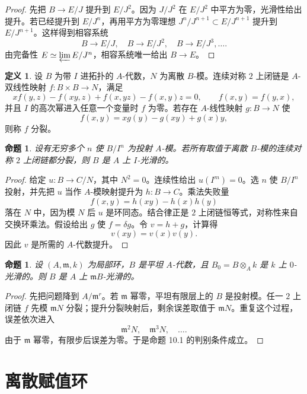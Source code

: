 \documentclass[11pt,a4paper,openany]{ctexbook}
\numberwithin{equation}{chapter}
\theoremstyle{plain}
\newtheorem{proposition}[theorem]{命题}
\theoremstyle{definition}
\newtheorem{definition}[theorem]{定义}
\theoremstyle{remark}
\begin{document}
\begin{proof}
先把 $B\to E/J$ 提升到 $E/J^2$。因为 $J/J^2$ 在 $E/J^2$ 中平方为零，光滑性给出提升。若已经提升到 $E/J^n$，再用平方为零理想 $J^n/J^{n+1}\subset E/J^{n+1}$ 提升到 $E/J^{n+1}$。这样得到相容系统
\[
  B\to E/J,\quad B\to E/J^2,\quad B\to E/J^3,\ldots.
\]
由完备性 $E\simeq\varprojlim E/J^n$，相容系统唯一给出 $B\to E$。
\end{proof}

\begin{definition}
设 $B$ 为带 $I$ 进拓扑的 $A$-代数，$N$ 为离散 $B$-模。连续对称 $2$ 上闭链是 $A$-双线性映射 $f:B\times B\to N$，满足
\[
  xf(y,z)-f(xy,z)+f(x,yz)-f(x,y)z=0,\qquad f(x,y)=f(y,x),
\]
并且 $I$ 的高次幂进入任意一个变量时 $f$ 为零。若存在 $A$-线性映射 $g:B\to N$ 使
\[
  f(x,y)=xg(y)-g(xy)+g(x)y,
\]
则称 $f$ 分裂。
\end{definition}

\begin{proposition}
设有无穷多个 $n$ 使 $B/I^n$ 为投射 $A$-模。若所有取值于离散 $B$-模的连续对称 $2$ 上闭链都分裂，则 $B$ 是 $A$ 上 $I$-光滑的。
\end{proposition}

\begin{proof}
给定 $u:B\to C/N$，其中 $N^2=0$。连续性给出 $u(I^m)=0$。选 $n$ 使 $B/I^n$ 投射，并先把 $u$ 当作 $A$-模映射提升为 $h:B\to C$。乘法失败量
\[
  f(x,y)=h(xy)-h(x)h(y)
\]
落在 $N$ 中，因为模 $N$ 后 $u$ 是环同态。结合律正是 $2$ 上闭链恒等式，对称性来自交换环乘法。假设给出 $g$ 使 $f=\delta g$。令 $v=h+g$，计算得
\[
  v(xy)=v(x)v(y).
\]
因此 $v$ 是所需的 $A$-代数提升。
\end{proof}

\begin{proposition}
设 $(A,\mathfrak m,k)$ 为局部环，$B$ 是平坦 $A$-代数，且 $B_0=B\otimes_Ak$ 是 $k$ 上 $0$-光滑的。则 $B$ 是 $A$ 上 $\mathfrak mB$-光滑的。
\end{proposition}

\begin{proof}
先把问题降到 $A/\mathfrak m^r$。若 $\mathfrak m$ 幂零，平坦有限层上的 $B$ 是投射模。任一 $2$ 上闭链 $f$ 先模 $\mathfrak mN$ 分裂；提升分裂映射后，剩余误差取值于 $\mathfrak mN$。重复这个过程，误差依次进入
\[
  \mathfrak m^2N,\quad \mathfrak m^3N,\quad \ldots .
\]
由于 $\mathfrak m$ 幂零，有限步后误差为零。于是命题 10.1 的判别条件成立。
\end{proof}

\section{离散赋值环}
\end{document}
